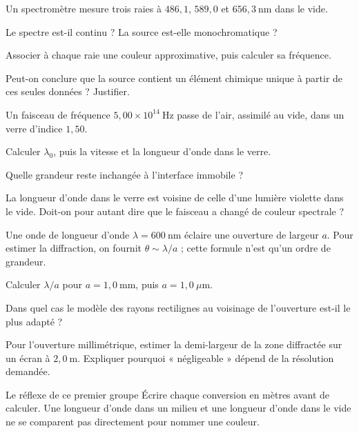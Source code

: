 Un spectromètre mesure trois raies à $486{,}1$, $589{,}0$ et $656{,}3\ \mathrm{nm}$ dans le vide.
\begin{questions}
\item Le spectre est-il continu ? La source est-elle monochromatique ?
\item Associer à chaque raie une couleur approximative, puis calculer sa fréquence.
\item Peut-on conclure que la source contient un élément chimique unique à partir de ces seules données ? Justifier.
\end{questions}
Un faisceau de fréquence $5{,}00\times10^{14}\ \mathrm{Hz}$ passe de l'air, assimilé au vide, dans un verre d'indice $1{,}50$.
\begin{questions}
\item Calculer $\lambda_0$, puis la vitesse et la longueur d'onde dans le verre.
\item Quelle grandeur reste inchangée à l'interface immobile ?
\item La longueur d'onde dans le verre est voisine de celle d'une lumière violette dans le vide. Doit-on pour autant dire que le faisceau a changé de couleur spectrale ?
\end{questions}
Une onde de longueur d'onde $\lambda=600\ \mathrm{nm}$ éclaire une ouverture de largeur $a$. Pour estimer la diffraction, on fournit $\theta\sim\lambda/a$ ; cette formule n'est qu'un ordre de grandeur.
\begin{questions}
\item Calculer $\lambda/a$ pour $a=1{,}0\ \mathrm{mm}$, puis $a=1{,}0\ \mu\mathrm{m}$.
\item Dans quel cas le modèle des rayons rectilignes au voisinage de l'ouverture est-il le plus adapté ?
\item Pour l'ouverture millimétrique, estimer la demi-largeur de la zone diffractée sur un écran à $2{,}0\ \mathrm{m}$. Expliquer pourquoi « négligeable » dépend de la résolution demandée.
\end{questions}
\begin{methode}{Le réflexe de ce premier groupe}
Écrire chaque conversion en mètres avant de calculer. Une longueur d'onde dans un milieu et une longueur d'onde dans le vide ne se comparent pas directement pour nommer une couleur.
\end{methode}

